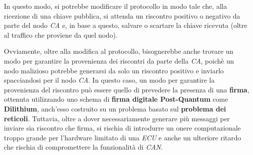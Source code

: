 In questo modo, si potrebbe modificare il protocollo in modo tale che, alla ricezione di una chiave pubblica, si attenda un riscontro positivo o negativo da parte del nodo \emph{CA} e, in base a questo, salvare o scartare la chiave ricevuta (oltre al traffico che proviene da quel nodo).

Ovviamente, oltre alla modifica al protocollo, bisognerebbe anche trovare un modo per garantire la provenienza dei riscontri da parte della \emph{CA}, poichè un nodo malizioso potrebbe generarsi da solo un riscontro positivo e inviarlo spacciandosi per il nodo \emph{CA}. In questo caso, un modo per garantire la provenienza del riscontro può essere quello di prevedere la presenza di una \textbf{firma}, ottenuta utilizzando uno schema di \textbf{firma digitale Post-Quantum} come \textbf{Dilithium}, anch'esso costruito su un problema basato sul \textbf{problema dei reticoli}. Tuttavia, oltre a dover necessariamente generare più messaggi per inviare sia riscontro che firma, si rischia di introdurre un onere computazionale troppo grande per l'hardware limitato di una \emph{ECU} e anche un ulteriore ritardo che rischia di compromettere la funzionalità di \emph{CAN}.
\newpage
